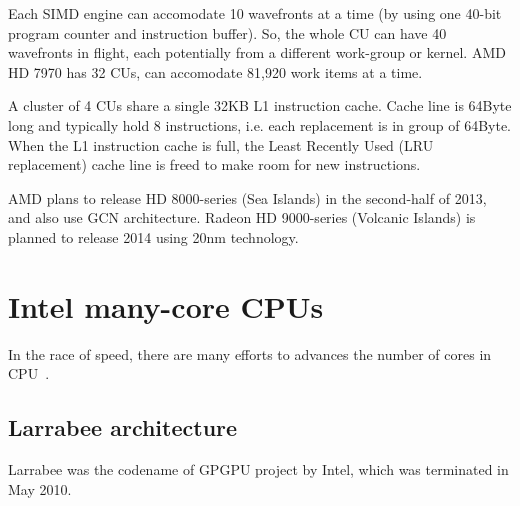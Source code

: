 Each SIMD engine can accomodate 10 wavefronts at a time (by using one 40-bit
program counter and instruction buffer). So, the whole CU can have 40 wavefronts
in flight, each potentially from a different work-group or kernel. AMD HD 7970
has 32 CUs, can accomodate 81,920 work items at a time.
 
A cluster of 4 CUs share a single 32KB L1 instruction cache. Cache line is
64Byte long and typically hold 8 instructions, i.e. each replacement is in group
of 64Byte. When the L1 instruction cache is full, the Least Recently Used (LRU
replacement) cache line is freed to make room for new instructions.

\begin{framed}
AMD plans to release HD 8000-series (Sea Islands) in the second-half of 2013,
and also use GCN architecture. Radeon HD 9000-series (Volcanic Islands) is
planned to release 2014 using 20nm technology.
\end{framed}


\chapter{Intel many-core CPUs}

In the race of speed, there are many efforts to advances the number of cores in
CPU~\citep{kahle2005cell}. 

\section{Larrabee  architecture}
\label{sec:Intel_GPGPU}

Larrabee was the codename of GPGPU project by Intel, which was terminated in May
2010. 

